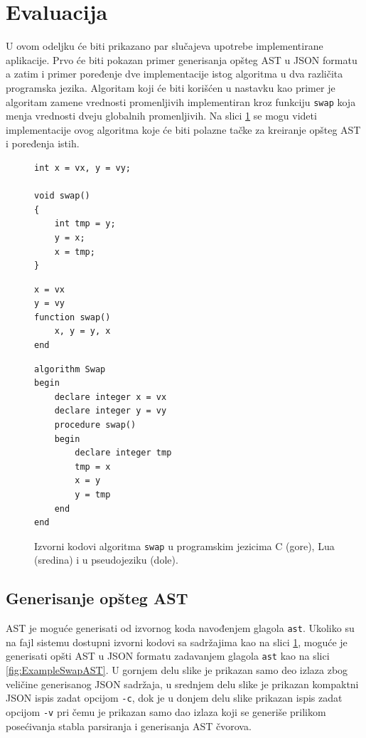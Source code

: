 \section{Evaluacija}
\label{sec:ImplementationExample}

U ovom odeljku će biti prikazano par slučajeva upotrebe implementirane aplikacije. Prvo će biti pokazan primer generisanja opšteg AST u JSON formatu a zatim i primer poređenje dve implementacije istog algoritma u dva različita programska jezika. Algoritam koji će biti korišćen u nastavku kao primer je algoritam zamene vrednosti promenljivih implementiran kroz funkciju \texttt{swap} koja menja vrednosti dveju globalnih promenljivih. Na slici \ref{fig:ExampleSwap} se mogu videti implementacije ovog algoritma koje će biti polazne tačke za kreiranje opšteg AST i poređenja istih.

\begin{figure}[h!]
\begin{lstlisting}
int x = vx, y = vy;

void swap() 
{
    int tmp = y;
    y = x;
    x = tmp;
}
\end{lstlisting}
\begin{lstlisting}
x = vx
y = vy
function swap()
	x, y = y, x
end
\end{lstlisting}
\begin{lstlisting}
algorithm Swap 
begin
    declare integer x = vx
    declare integer y = vy
    procedure swap()
    begin
        declare integer tmp 
        tmp = x
        x = y  
        y = tmp
    end
end
\end{lstlisting}
\caption{Izvorni kodovi algoritma \texttt{swap} u programskim jezicima C (gore), Lua (sredina) i u pseudojeziku (dole).}
\label{fig:ExampleSwap}
\end{figure}


\subsection{Generisanje opšteg AST}
\label{subsec:ImplementationExampleAST}

AST je moguće generisati od izvornog koda navođenjem glagola \texttt{ast}. Ukoliko su na fajl sistemu dostupni izvorni kodovi sa sadržajima kao na slici \ref{fig:ExampleSwap}, moguće je generisati opšti AST u JSON formatu zadavanjem glagola \texttt{ast} kao na slici \ref{fig:ExampleSwapAST}. U gornjem delu slike je prikazan samo deo izlaza zbog veličine generisanog JSON sadržaja, u srednjem delu slike je prikazan kompaktni JSON ispis zadat opcijom \texttt{-c}, dok je u donjem delu slike prikazan ispis zadat opcijom \texttt{-v} pri čemu je prikazan samo dao izlaza koji se generiše prilikom posećivanja stabla parsiranja i generisanja AST čvorova.

